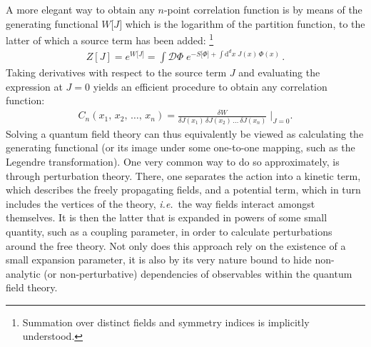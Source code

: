 \documentclass[11pt]{book}
\newcommand\ie{\textit{i.e.}\ }
\numberwithin{equation}{chapter}
\begin{document}
A more elegant way to obtain any $n$-point correlation function is
by means of the generating functional $W \lbrack J \rbrack$
which is the logarithm of the partition function, to the latter of which
a source term
has been added:%
\footnote{%
  Summation over distinct fields and symmetry indices is implicitly
  understood.
}
\begin{align}
  Z[J] =
  e^{ W \lbrack J \rbrack }
  = \int \mathcal D \Phi \;
  e^{
    - S \lbrack \Phi \rbrack
    + \int \mathrm d^dx \; J(x) \, \Phi(x)
  } \,.
  \label{eq:modpartitionfct}
\end{align}
Taking derivatives with respect to the source term $J$ and evaluating
the expression at $J=0$ yields an efficient procedure to obtain
any correlation function:
\begin{align}
  C_n(x_1, \, x_2,\, \dots, \, x_n) =
  \frac{ \delta W }{ \delta J(x_1) \, \delta J(x_2) \, \dots \, \delta J(x_n) }
  \; \bigg|_{J=0} .
\end{align}
Solving a quantum field theory can
thus equivalently be viewed as calculating the generating functional
(or its image under some one-to-one mapping, such as the
Legendre transformation).
One very common way to do so approximately, is through perturbation
theory. There, one separates the action into a kinetic term, which
describes the freely propagating fields, and a potential term,
which in turn includes the vertices of the theory, \ie the way fields
interact amongst themselves. It is then the latter that is expanded
in powers of some small quantity, such as a coupling parameter,
in order to calculate perturbations around the free theory.
Not only does this approach rely on the existence of a small expansion
parameter, it is also by its very nature bound to hide non-analytic
(or non-perturbative) dependencies of observables within the quantum field theory.
\end{document}
